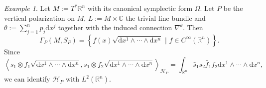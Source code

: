 \documentclass[11pt]{amsart}
\numberwithin{equation}{section}
\theoremstyle{plain}
\theoremstyle{definition}
\theoremstyle{remark}
\newtheorem{ex}{Example}[subsection]
\newcommand{\R}{\mathbb{R}}
\newcommand{\dd}{{\mathrm{d}}}
\newcommand{\calH}{\mathcal{H}}
\begin{document}
\begin{ex}
Let $M:=T^*\R^n$ with its canonical symplectic form $\Omega$. Let $P$ be the vertical polarization on $M$, $L:=M\times\mathbb{C}$ the trivial line bundle and $\theta:=\sum_{j=1}^np_j\dd x^j$ together with the induced connection $\nabla^\theta$. Then 
$$\Gamma_P(M,S_P)=\left\{ f(x)\sqrt{\dd x^1\land\dotsm \land \dd x^n}\,\,\big|\,\,  f\in C^\infty(\R^n)\right\}.$$
Since 
$$\left\langle s_1\otimes f_1\sqrt{\dd x^1\land\dotsm \land \dd x^n},s_1\otimes f_2\sqrt{\dd x^1\land\dotsm \land \dd x^n}\right\rangle_{\calH_P}=\int_{\R^n}\bar s_1s_2\bar f_1 f_2\dd x^1\land\dotsm \land \dd x^n,$$
we can identify $\calH_P$ with $L^2(\R^n)$.
\end{ex}























\printbibliography
\end{document}
